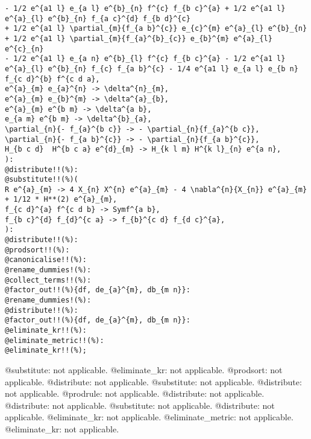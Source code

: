 \documentclass[11pt]{article}
\begin{document}
{\begin{verbatim}
- 1/2 e^{a1 l} e_{a l} e^{b}_{n} f^{c} f_{b c}^{a} + 1/2 e^{a1 l} e^{a}_{l} e^{b}_{n} f_{a c}^{d} f_{b d}^{c} 
+ 1/2 e^{a1 l} \partial_{m}{f_{a b}^{c}} e_{c}^{m} e^{a}_{l} e^{b}_{n} + 1/2 e^{a1 l} \partial_{m}{f_{a}^{b}_{c}} e_{b}^{m} e^{a}_{l} e^{c}_{n} 
- 1/2 e^{a1 l} e_{a n} e^{b}_{l} f^{c} f_{b c}^{a} - 1/2 e^{a1 l} e^{a}_{l} e^{b}_{n} f_{c} f_{a b}^{c} - 1/4 e^{a1 l} e_{a l} e_{b n} f_{c d}^{b} f^{c d a},
e^{a}_{m} e_{a}^{n} -> \delta^{n}_{m},
e^{a}_{m} e_{b}^{m} -> \delta^{a}_{b},
e^{a}_{m} e^{b m} -> \delta^{a b},
e_{a m} e^{b m} -> \delta^{b}_{a},
\partial_{n}{- f_{a}^{b c}} -> - \partial_{n}{f_{a}^{b c}},
\partial_{n}{- f_{a b}^{c}} -> - \partial_{n}{f_{a b}^{c}},
H_{b c d}  H^{b c a} e^{d}_{m} -> H_{k l m} H^{k l}_{n} e^{a n},
):
@distribute!!(%):
@substitute!!(%)(
R e^{a}_{m} -> 4 X_{n} X^{n} e^{a}_{m} - 4 \nabla^{n}{X_{n}} e^{a}_{m} + 1/12 * H**(2) e^{a}_{m},
f_{c d}^{a} f^{c d b} -> Symf^{a b},
f_{b c}^{d} f_{d}^{c a} -> f_{b}^{c d} f_{d c}^{a},
):
@distribute!!(%):
@prodsort!!(%):
@canonicalise!!(%):
@rename_dummies!(%):
@collect_terms!!(%):
@factor_out!!(%){df, de_{a}^{m}, db_{m n}}:
@rename_dummies!(%):
@distribute!!(%):
@factor_out!!(%){df, de_{a}^{m}, db_{m n}}:
@eliminate_kr!!(%):
@eliminate_metric!!(%):
@eliminate_kr!!(%);
\end{verbatim}}
@substitute: not applicable.
@eliminate\_kr: not applicable.
@prodsort: not applicable.
@distribute: not applicable.
@substitute: not applicable.
@distribute: not applicable.
@prodrule: not applicable.
@distribute: not applicable.
@distribute: not applicable.
@substitute: not applicable.
@distribute: not applicable.
@eliminate\_kr: not applicable.
@eliminate\_metric: not applicable.
@eliminate\_kr: not applicable.
\end{document}
